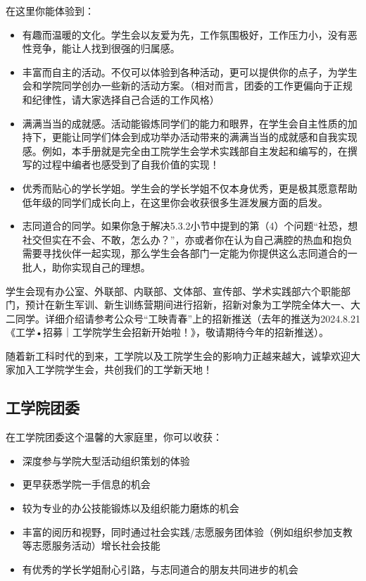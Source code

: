 \documentclass[11pt,oneside]{book}
\begin{document}
在这里你能体验到：
\begin{itemize}
    \item 有趣而温暖的文化。学生会以友爱为先，工作氛围极好，工作压力小，没有恶性竞争，能让人找到很强的归属感。
    \item 丰富而自主的活动。不仅可以体验到各种活动，更可以提供你的点子，为学生会和学院同学创办一些新的活动方案。（相对而言，团委的工作更偏向于正规和纪律性，请大家选择自己合适的工作风格）
    \item 满满当当的成就感。活动能锻炼同学们的能力和眼界，在学生会自主性质的加持下，更能让同学们体会到成功举办活动带来的满满当当的成就感和自我实现感。例如，本手册就是完全由工院学生会学术实践部自主发起和编写的，在撰写的过程中编者也感受到了自我价值的实现！
    \item 优秀而贴心的学长学姐。学生会的学长学姐不仅本身优秀，更是极其愿意帮助低年级的同学们成长向上，在这里你会收获很多生涯发展方面的启发。
    \item 志同道合的同学。如果你急于解决5.3.2小节中提到的第（4）个问题“社恐，想社交但实在不会、不敢，怎么办？”，亦或者你在认为自己满腔的热血和抱负需要寻找伙伴一起实现，那么学生会各部门一定能为你提供这么志同道合的一批人，助你实现自己的理想。
\end{itemize}
学生会现有办公室、外联部、内联部、文体部、宣传部、学术实践部六个职能部门，预计在新生军训、新生训练营期间进行招新，招新对象为工学院全体大一、大二同学。详细介绍请参考公众号“工映青春”上的招新推送（去年的推送为2024.8.21《工学•招募｜工学院学生会招新开始啦！》，敬请期待今年的招新推送）。

随着新工科时代的到来，工学院以及工院学生会的影响力正越来越大，诚挚欢迎大家加入工学院学生会，共创我们的工学新天地！
\subsection{工学院团委}

在工学院团委这个温馨的大家庭里，你可以收获：

\begin{itemize}

    \item 深度参与学院大型活动组织策划的体验
    \item 更早获悉学院一手信息的机会
    \item 较为专业的办公技能锻炼以及组织能力磨炼的机会
    \item 丰富的阅历和视野，同时通过社会实践/志愿服务团体验（例如组织参加支教等志愿服务活动）增长社会技能
    \item 有优秀的学长学姐耐心引路，与志同道合的朋友共同进步的机会
\end{itemize}
\end{document}
